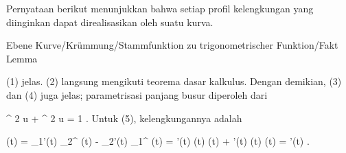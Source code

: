Pernyataan berikut menunjukkan bahwa setiap profil kelengkungan yang diinginkan dapat direalisasikan oleh suatu kurva.


{Ebene Kurve/Krümmung/Stammfunktion zu trigonometrischer Funktion/Fakt}
{Lemma}
{}
{

\faktzusatz {}
\faktzusatz {}

}
{

(1) jelas. (2) langsung mengikuti teorema dasar kalkulus. Dengan demikian, (3) dan (4) juga jelas; parametrisasi panjang busur diperoleh dari

\mavergleichskette
{\vergleichskette
{ \cos^{ 2  }  u + \sin^{ 2  }  u
}
{ = }{ 1
}
{  }{
}
{    }{
}
{   }{
}
}
{}{}{.}
Untuk (5), kelengkungannya adalah

\mavergleichskettedisp
{\vergleichskette
{ \kappa(t)
}
{ =} { \gamma_1'(t) \gamma_2^{\prime \prime} (t) - \gamma_2'(t) \gamma_1^{\prime \prime} (t)
}
{ =} { \psi'(t) \cos  \psi(t)  \cos  \psi(t) + \psi'(t)  \sin  \psi(t)  \sin  \psi(t)
}
{ =} { \psi'(t)
}
{ } {
}
}
{}{}{.}

}




